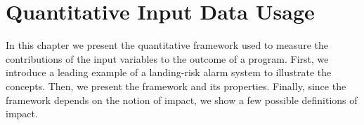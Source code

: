 %

\chapter{Quantitative Input Data Usage}

In this chapter we present the quantitative framework used to measure the contributions of the input variables to the outcome of a program. First, we introduce a leading example of a landing-risk alarm system to illustrate the concepts. Then, we present the framework and its properties. Finally, since the framework depends on the notion of impact, we show a few possible definitions of impact.







